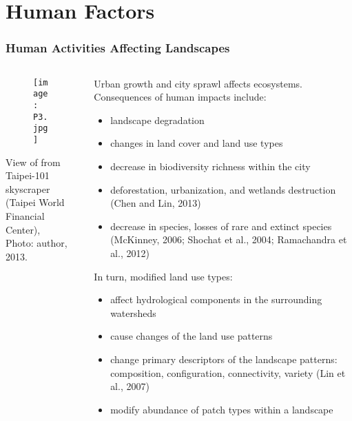 \documentclass[pdflatex,compress,8pt,
	xcolor={dvipsnames,dvipsnames,svgnames,x11names,table},
	hyperref={	
	breaklinks = true, 
	pdfauthor={Lemenkova Polina}, 
	pdfsubject={Preentation}, 
	pdfcreator={Lemenkova Polina}, 
	pdfproducer={Lemenkova Polina}, 
	colorlinks=true,
	linkcolor=Gold1, 
	citecolor=NavyBlue, 
	urlcolor = NavyBlue, 
	breaklinks = true}]{beamer}
\begin{document}
\section{Human Factors}
\begin{frame}\frametitle{Human Activities Affecting Landscapes}
\begin{minipage}[0.4\textheight]{\textwidth}
\begin{columns}[T]
\begin{column}{0.4\textwidth}
\begin{figure}[H]
	\centering
		\texttt{[image: P3.jpg]}
\end{figure}
\small{View of from Taipei-101 skyscraper \\
(Taipei World Financial Center), \\
Photo: author, 2013.}
\end{column}
\begin{column}{0.6\textwidth}
\vspace{1em}
Urban growth and city sprawl affects ecosystems. \\
Consequences of human impacts include:
\small{
\begin{itemize}
	\item landscape degradation
	\item changes in land cover and land use types
	\item decrease in biodiversity richness within the city
	\item deforestation, urbanization, and wetlands destruction (Chen and Lin, 2013)
	\item decrease in species, losses of rare and extinct species (McKinney, 2006; Shochat et al., 2004; Ramachandra et al., 2012)
\end{itemize}
In turn, modified land use types:
\begin{itemize}
	\item affect hydrological components in the surrounding watersheds
	\item cause changes of the land use \alert{patterns}
	\item change primary descriptors of the landscape patterns: \alert{composition, configuration, connectivity, variety} (Lin et al., 2007)
	\item modify \alert{abundance} of patch types within a landscape
\end{itemize}}
\end{column}
\end{columns}
\end{minipage}
\end{frame}
\end{document}
